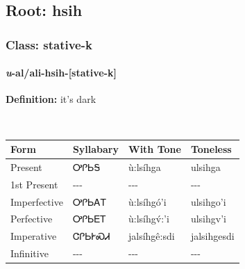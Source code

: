 \needspace{4in}
\subsection*{Root: hsih}
\nopagebreak
{}
\needspace{3in}
\subsubsection*{Class: stative-k}
\nopagebreak
\needspace{2in}
\paragraph*{\textit{u}{-}al/ali{-}\textbf{hsih}{-}[stative-k]}
\nopagebreak
\textbf{Definition: } it{\textquoteright}s dark
\\[0.5em]
\begin{tabularx}{\textwidth}{l X X X}%
\toprule%
\textbf{Form}&\textbf{Syllabary}&\textbf{With Tone}&\textbf{Toneless}\\%
\midrule%
Present&ᎤᎵᏏᎦ&ù:lsíhga&ulsihga\\%
1st Present&{-}{-}{-}&{-}{-}{-}&{-}{-}{-}\\%
Imperfective&ᎤᎵᏏᎪᎢ&ù:lsíhgó’i&ulsihgo’i\\%
Perfective&ᎤᎵᏏᎬᎢ&ù:lsíhgv́:’i&ulsihgv’i\\%
Imperative&ᏣᎵᏏᎨᏍᏗ&jalsíhgê:sdi&jalsihgesdi\\%
Infinitive&{-}{-}{-}&{-}{-}{-}&{-}{-}{-}\\%
\bottomrule%
\end{tabularx}
\\[1em]